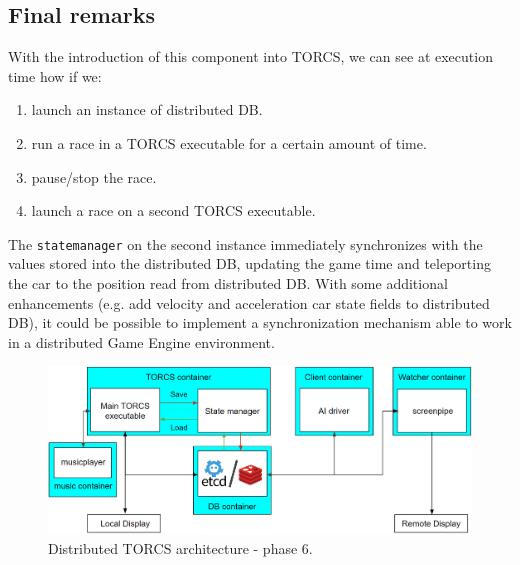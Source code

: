 \subsection{Final remarks}
With the introduction of this component into TORCS, we can see at execution time how if we:
\begin{enumerate}
	\item launch an instance of distributed DB.
	\item run a race in a TORCS executable for a certain amount of time.
	\item pause/stop the race.
	\item launch a race on a second TORCS executable.
\end{enumerate}
The \texttt{statemanager} on the second instance immediately synchronizes with the values stored into the distributed DB, updating the game time and teleporting the car to the position read from distributed DB.
With some additional enhancements (e.g. add velocity and acceleration car state fields to distributed DB), it could be possible to implement a synchronization mechanism able to work in a distributed Game Engine environment.

\begin{figure}
	\centering
	\includegraphics[width=0.95\linewidth]{"immagini/Software development/Development-6"}
	\caption[Distributed TORCS architecture - phase 6.]{Distributed TORCS architecture - phase 6.}
	\label{fig:development-6}
\end{figure}

